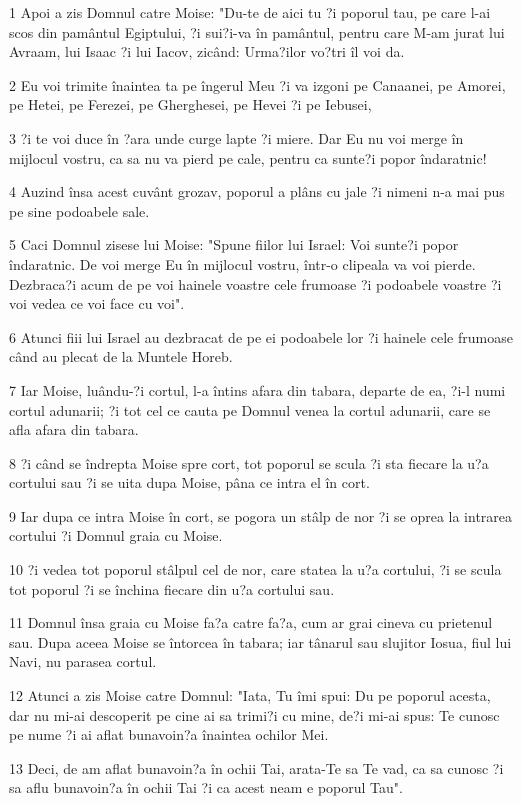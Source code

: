 \par 1 Apoi a zis Domnul catre Moise: "Du-te de aici tu ?i poporul tau, pe care l-ai scos din pamântul Egiptului, ?i sui?i-va în pamântul, pentru care M-am jurat lui Avraam, lui Isaac ?i lui Iacov, zicând: Urma?ilor vo?tri îl voi da.
\par 2 Eu voi trimite înaintea ta pe îngerul Meu ?i va izgoni pe Canaanei, pe Amorei, pe Hetei, pe Ferezei, pe Gherghesei, pe Hevei ?i pe Iebusei,
\par 3 ?i te voi duce în ?ara unde curge lapte ?i miere. Dar Eu nu voi merge în mijlocul vostru, ca sa nu va pierd pe cale, pentru ca sunte?i popor îndaratnic!
\par 4 Auzind însa acest cuvânt grozav, poporul a plâns cu jale ?i nimeni n-a mai pus pe sine podoabele sale.
\par 5 Caci Domnul zisese lui Moise: "Spune fiilor lui Israel: Voi sunte?i popor îndaratnic. De voi merge Eu în mijlocul vostru, într-o clipeala va voi pierde. Dezbraca?i acum de pe voi hainele voastre cele frumoase ?i podoabele voastre ?i voi vedea ce voi face cu voi".
\par 6 Atunci fiii lui Israel au dezbracat de pe ei podoabele lor ?i hainele cele frumoase când au plecat de la Muntele Horeb.
\par 7 Iar Moise, luându-?i cortul, l-a întins afara din tabara, departe de ea, ?i-l numi cortul adunarii; ?i tot cel ce cauta pe Domnul venea la cortul adunarii, care se afla afara din tabara.
\par 8 ?i când se îndrepta Moise spre cort, tot poporul se scula ?i sta fiecare la u?a cortului sau ?i se uita dupa Moise, pâna ce intra el în cort.
\par 9 Iar dupa ce intra Moise în cort, se pogora un stâlp de nor ?i se oprea la intrarea cortului ?i Domnul graia cu Moise.
\par 10 ?i vedea tot poporul stâlpul cel de nor, care statea la u?a cortului, ?i se scula tot poporul ?i se închina fiecare din u?a cortului sau.
\par 11 Domnul însa graia cu Moise fa?a catre fa?a, cum ar grai cineva cu prietenul sau. Dupa aceea Moise se întorcea în tabara; iar tânarul sau slujitor Iosua, fiul lui Navi, nu parasea cortul.
\par 12 Atunci a zis Moise catre Domnul: "Iata, Tu îmi spui: Du pe poporul acesta, dar nu mi-ai descoperit pe cine ai sa trimi?i cu mine, de?i mi-ai spus: Te cunosc pe nume ?i ai aflat bunavoin?a înaintea ochilor Mei.
\par 13 Deci, de am aflat bunavoin?a în ochii Tai, arata-Te sa Te vad, ca sa cunosc ?i sa aflu bunavoin?a în ochii Tai ?i ca acest neam e poporul Tau".
